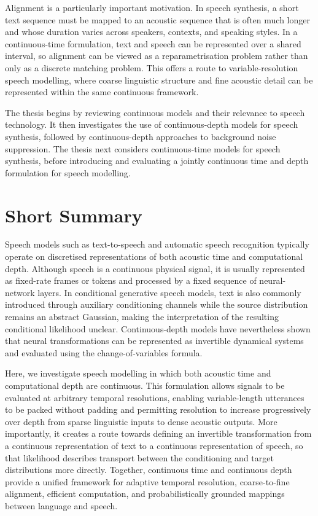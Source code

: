 Alignment is a particularly important motivation. In speech synthesis, a short text sequence must be mapped to an acoustic sequence that is often much longer and whose duration varies across speakers, contexts, and speaking styles. In a continuous-time formulation, text and speech can be represented over a shared interval, so alignment can be viewed as a reparametrisation problem rather than only as a discrete matching problem. This offers a route to variable-resolution speech modelling, where coarse linguistic structure and fine acoustic detail can be represented within the same continuous framework.

The thesis begins by reviewing continuous models and their relevance to speech technology. It then investigates the use of continuous-depth models for speech synthesis, followed by continuous-depth approaches to background noise suppression. The thesis next considers continuous-time models for speech synthesis, before introducing and evaluating a jointly continuous time and depth formulation for speech modelling.




\section{Short Summary}
Speech models such as text-to-speech and automatic speech recognition typically operate on discretised representations of both acoustic time and computational depth. Although speech is a continuous physical signal, it is usually represented as fixed-rate frames or tokens and processed by a fixed sequence of neural-network layers. In conditional generative speech models, text is also commonly introduced through auxiliary conditioning channels while the source distribution remains an abstract Gaussian, making the interpretation of the resulting conditional likelihood unclear. Continuous-depth models have nevertheless shown that neural transformations can be represented as invertible dynamical systems and evaluated using the change-of-variables formula.

Here, we investigate speech modelling in which both acoustic time and computational depth are continuous. This formulation allows signals to be evaluated at arbitrary temporal resolutions, enabling variable-length utterances to be packed without padding and permitting resolution to increase progressively over depth from sparse linguistic inputs to dense acoustic outputs. More importantly, it creates a route towards defining an invertible transformation from a continuous representation of text to a continuous representation of speech, so that likelihood describes transport between the conditioning and target distributions more directly. Together, continuous time and continuous depth provide a unified framework for adaptive temporal resolution, coarse-to-fine alignment, efficient computation, and probabilistically grounded mappings between language and speech.

